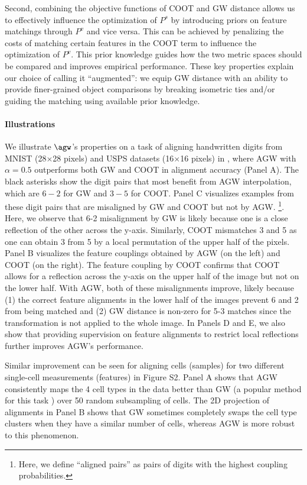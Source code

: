 Second, combining the objective functions of COOT and GW distance allows us to
effectively influence the optimization of $P^s$ by introducing priors on feature matchings
through $P^v$ and vice versa. This can be achieved by penalizing the costs of matching
certain features in the COOT term to influence the optimization of $P^v$. This prior knowledge
guides how the two metric spaces should be compared and improves empirical performance.
These key properties explain our choice of calling it ``augmented'':
we equip GW distance with an ability to provide finer-grained object comparisons by
breaking isometric ties and/or guiding the matching using available prior knowledge.

\paragraph{Illustrations} We illustrate $\agw$'s properties on a task of aligning handwritten digits
from MNIST \citep{lecun10} (28$\times$28 pixels) and USPS datasets (16$\times$16 pixels)
\citep{Hull94} in , where AGW with $\alpha=0.5$ outperforms both GW and COOT
in alignment accuracy (Panel A). The black asterisks show the digit pairs that most benefit
from AGW interpolation, which are $6-2$ for GW and $3-5$ for COOT.
Panel C visualizes examples from these digit pairs that are misaligned by GW and COOT
but not by AGW.
\footnote{Here, we define ``aligned pairs'' as pairs of digits with the
highest coupling probabilities.}. Here, we observe that 6-2 misalignment by GW is likely because
one is a close reflection of the other across the y-axis. Similarly,
COOT mismatches 3 and 5 as one can obtain 3 from 5 by a local permutation of
the upper half of the pixels. Panel B visualizes the feature couplings obtained by
AGW (on the left) and COOT (on the right). The feature coupling by COOT confirms that
COOT allows for a reflection across the y-axis on the upper half of the image
but not on the lower half. With AGW, both of these misalignments improve,
likely because (1) the correct feature alignments in the lower half of the images
prevent 6 and 2 from being matched and (2) GW distance is non-zero for 5-3 matches
since the transformation is not applied to the whole image. In Panels D and E,
we also show that providing supervision on feature alignments to restrict local reflections
further improves AGW's performance.

Similar improvement can be seen for aligning cells (samples) for two different single-cell
measurements (features) \citep{SNAREseq} in Figure S2. Panel A shows that AGW consistently maps
the 4 cell types in the data better than GW (a popular method for this task
\citep{Pamona,Demetci20,Demetci22,UniPort}) over 50 random subsampling of cells.
The 2D projection of alignments in Panel B shows that GW sometimes completely swaps
the cell type clusters when they have a similar number of cells, whereas AGW is more robust
to this phenomenon.

